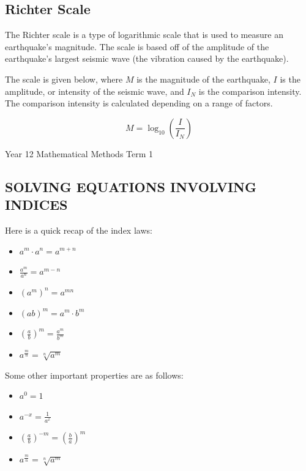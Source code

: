 \documentclass[12pt]{article}
\begin{document}
\subsection*{Richter Scale}

The Richter scale is a type of logarithmic scale that is used to measure an earthquake's magnitude. The scale is based off of the amplitude of the earthquake's largest seismic wave (the vibration caused by the earthquake).

The scale is given below, where \( M \) is the magnitude of the earthquake, \( I \) is the amplitude, or intensity of the seismic wave, and \( I_N \) is the comparison intensity. The comparison intensity is calculated depending on a range of factors.

\[ 
  M = \log_{10}\left(\frac{I}{I_N}\right) 
\]


\vfill %
\flushleft


\newpage %

\noindent Year 12 Mathematical Methods \hfill Term 1


\subsection*{SOLVING EQUATIONS INVOLVING INDICES}

\noindent Here is a quick recap of the index laws:
\begin{itemize}
    \item \(a^m \cdot a^n = a^{m+n}\)
    \item \(\frac{a^m}{a^n} = a^{m-n}\)
    \item \((a^m)^n = a^{mn}\)
    \item \((ab)^m = a^m \cdot b^m\)
    \item \(\left(\frac{a}{b}\right)^m = \frac{a^m}{b^m}\)
    \item \(a^{\frac{m}{n}} = \sqrt[n]{a^m}\)
\end{itemize}

\noindent Some other important properties are as follows:
\begin{itemize}
    \item \(a^0 = 1\)
    \item \(a^{-x} = \frac{1}{a^x}\)
    \item \(\left(\frac{a}{b}\right)^{-m} = \left(\frac{b}{a}\right)^m\)
    \item \(a^{\frac{m}{n}} = \sqrt[n]{a^m}\)
\end{itemize}
\end{document}
